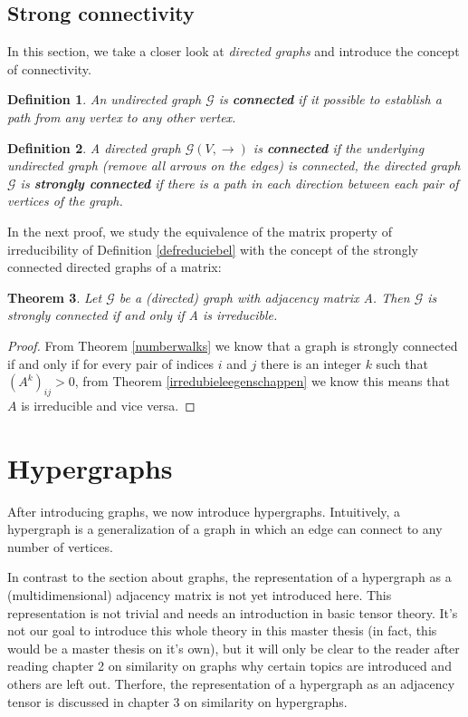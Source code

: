 \documentclass[a4paper,11pt]{report}
\newtheorem{theorem}{Theorem}[section]
\newtheorem{definition}[theorem]{Definition}
\newcommand{\graf}{\mathscr{G}}
\begin{document}
\subsection{Strong connectivity}
In this section, we take a closer look at \emph{directed graphs} and introduce 
the concept of connectivity.
\begin{definition}
  An undirected graph $\graf$ is \textbf{connected} if it possible to establish a path from any 
   vertex to any other vertex.
    \end{definition}
\begin{definition}
  A directed graph $\graf(V, \to)$ is \textbf{connected} if the underlying undirected graph
  (remove all arrows on the edges) is connected, the directed graph $\graf$ is \textbf{strongly connected} if 
  there is a path in each direction between each pair of vertices of the graph.
    \end{definition}

In the next proof, we study the equivalence of the matrix property of 
irreducibility of  Definition \ref{defreduciebel} with the concept of the 
strongly connected directed graphs of a matrix:
\begin{theorem}
    Let $\graf$ be a (directed) graph with adjacency matrix A. Then $\graf$ is strongly connected if and only if A is irreducible.

\end{theorem}

\begin{proof}
From Theorem \ref{numberwalks} we know that a graph is strongly connected if and only if for every pair of indices $i$ and $j$ 
there is an integer $k$ such that $(A^k)_{ij} > 0$, from Theorem \ref{irredubieleegenschappen} we 
know this means that $A$ is irreducible and vice versa.

\end{proof}

\section{Hypergraphs}
After introducing graphs, we now introduce hypergraphs. Intuitively, a 
hypergraph is a generalization of a graph in which an edge can connect to any 
number of vertices. 

In contrast to the section about graphs, the representation of a hypergraph as a (multidimensional) adjacency matrix 
is not yet introduced here. This representation is not trivial and needs an 
introduction in basic tensor theory. It's not our goal to introduce this whole theory in this master thesis (in fact, this would
be a master thesis on it's own), but it will only be clear to the reader after reading chapter 
2 on similarity on graphs why certain topics are introduced and others are 
left out. Therfore, the representation of a hypergraph as an adjacency tensor is 
discussed in chapter 3 on similarity on hypergraphs.
\end{document}
